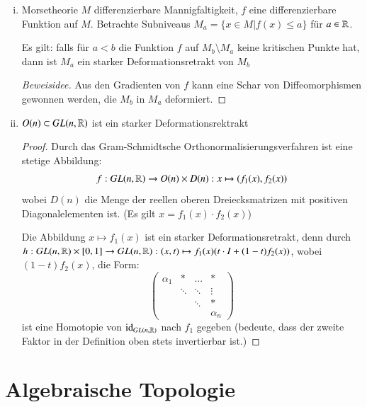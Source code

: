 \documentclass[a4paper,10pt]{scrartcl}
\begin{document}
\begin{exs*}
\begin{enumerate}[(i)]
 \item 
\begin{seg}{Morsetheorie} 
$M$ differenzierbare Mannigfaltigkeit, $f$ eine differenzierbare Funktion auf $M$. Betrachte Subniveaus $M_a=\{x\in M|f(x)\le a\}$ für $a\in \mathbb{R}$.
 \begin{figure}[H]
\centering
 \fixme[fig47]
\caption{}
\end{figure}
Es gilt: falls für $a<b$ die Funktion $f$ auf $M_b\setminus M_a$ keine kritischen Punkte hat, dann ist $M_a$ ein starker Deformationsretrakt von $M_{b}$
\end{seg}
\begin{proof}[Beweisidee]
 Aus den Gradienten von $f$ kann eine Schar von Diffeomorphismen gewonnen werden, die $M_b$ in $M_a$ deformiert.
\end{proof}
\item $O(n)\subset GL(n, \mathbb{R})$ ist ein starker Deformationsrektrakt
\begin{proof}
 Durch das Gram-Schmidtsche Orthonormalisierungsverfahren ist eine stetige Abbildung:
\[
 f: GL(n,\mathbb{R})\to O(n)\times D(n): x\mapsto (f_1(x), f_2(x))
\]
wobei $D(n)$ die Menge der reellen oberen Dreiecksmatrizen mit positiven Diagonalelementen ist. (Es gilt $x=f_1(x)\cdot f_2(x)$)

Die Abbildung $x\mapsto f_1(x)$ ist ein starker Deformationsretrakt, denn durch $h: GL(n,\mathbb{R})\times [0,1]\to GL(n,\mathbb{R}): (x,t)\mapsto f_1(x)(t\cdot I+(1-t)f_2(x))$, wobei $(1-t)f_2(x)$, die Form:
 \[
  \begin{pmatrix}
   \alpha_1 & * & ...& *\\
 & \ddots & \ddots & \vdots\\
 & & \ddots & *\\
 & & & \alpha_n
  \end{pmatrix}
 \]
ist eine Homotopie von $\operatorname{id}_{GL(n, \mathbb{R})}$ nach $f_1$ gegeben (bedeute, dass der zweite Faktor in der Definition oben stets invertierbar ist.)
\end{proof}
\end{enumerate}
\end{exs*}
\section{Algebraische Topologie}
\end{document}
